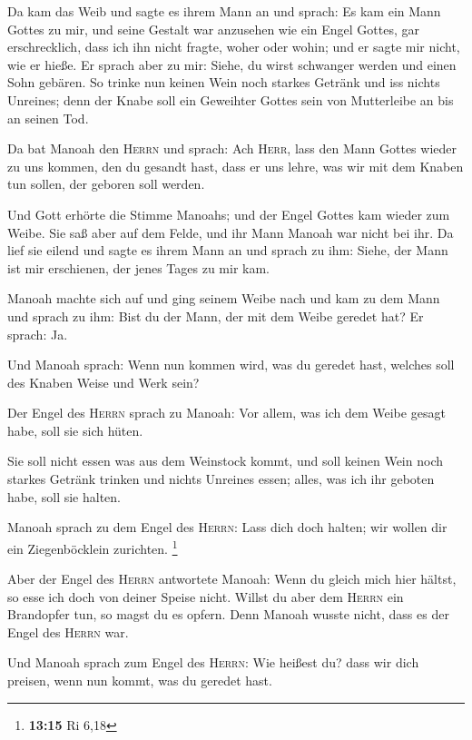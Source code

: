  Da kam das Weib und sagte es ihrem Mann an und sprach: Es
kam ein Mann Gottes zu mir, und seine Gestalt war anzusehen wie ein
Engel Gottes, gar erschrecklich, dass ich ihn nicht fragte, woher oder
wohin; und er sagte mir nicht, wie er hieße.  Er sprach
aber zu mir: Siehe, du wirst schwanger werden und einen Sohn gebären. So
trinke nun keinen Wein noch starkes Getränk und iss nichts Unreines;
denn der Knabe soll ein Geweihter Gottes sein von Mutterleibe an bis an
seinen Tod.

 Da bat Manoah den \textsc{Herrn} und sprach: Ach
\textsc{Herr}, lass den Mann Gottes wieder zu uns kommen, den du gesandt
hast, dass er uns lehre, was wir mit dem Knaben tun sollen, der geboren
soll werden.

 Und Gott erhörte die Stimme Manoahs; und der Engel Gottes
kam wieder zum Weibe. Sie saß aber auf dem Felde, und ihr Mann Manoah
war nicht bei ihr.  Da lief sie eilend und sagte es ihrem
Mann an und sprach zu ihm: Siehe, der Mann ist mir erschienen, der jenes
Tages zu mir kam.

 Manoah machte sich auf und ging seinem Weibe nach und
kam zu dem Mann und sprach zu ihm: Bist du der Mann, der mit dem Weibe
geredet hat? Er sprach: Ja.

 Und Manoah sprach: Wenn nun kommen wird, was du geredet
hast, welches soll des Knaben Weise und Werk sein?

 Der Engel des \textsc{Herrn} sprach zu Manoah: Vor
allem, was ich dem Weibe gesagt habe, soll sie sich hüten.

 Sie soll nicht essen was aus dem Weinstock kommt, und
soll keinen Wein noch starkes Getränk trinken und nichts Unreines essen;
alles, was ich ihr geboten habe, soll sie halten.

 Manoah sprach zu dem Engel des \textsc{Herrn}: Lass dich
doch halten; wir wollen dir ein Ziegenböcklein zurichten. \footnote{\textbf{13:15}
  Ri 6,18}

 Aber der Engel des \textsc{Herrn} antwortete Manoah:
Wenn du gleich mich hier hältst, so esse ich doch von deiner Speise
nicht. Willst du aber dem \textsc{Herrn} ein Brandopfer tun, so magst du
es opfern. Denn Manoah wusste nicht, dass es der Engel des
\textsc{Herrn} war.

 Und Manoah sprach zum Engel des \textsc{Herrn}: Wie
heißest du? dass wir dich preisen, wenn nun kommt, was du geredet hast.

